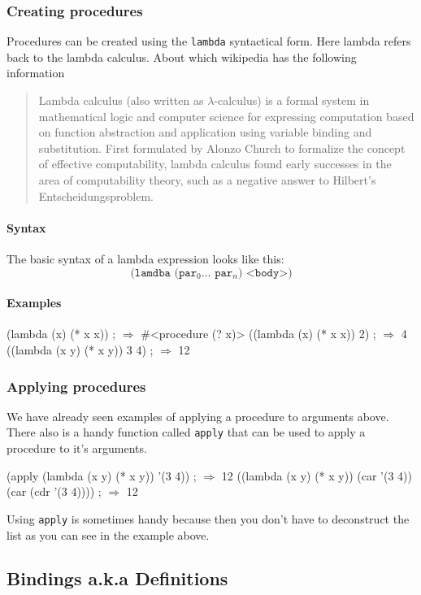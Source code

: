 \documentclass[12pt,a4paper,draft,twoside]{article}
\begin{document}
\subsubsection{Creating procedures}
Procedures can be created using the \texttt{lambda} syntactical form. Here lambda refers back to the lambda calculus. About which wikipedia \cite{lambda} has the following information
\begin{quotation}
Lambda calculus (also written as $\lambda$-calculus) is a formal system in mathematical logic and computer science for expressing computation based on function abstraction and application using variable binding and substitution. First formulated by Alonzo Church to formalize the concept of effective computability, lambda calculus found early successes in the area of computability theory, such as a negative answer to Hilbert's Entscheidungsproblem.
\end{quotation}
\paragraph{Syntax}
The basic syntax of a lambda expression looks like this:
\begin{equation*}
\texttt{(lamdba (par$_{0} \dots$ par$_{n}$) <body>)}
\end{equation*}
\paragraph{Examples}
\begin{schemecode}
(lambda (x) (* x x)) ; $\Rightarrow$ #<procedure (? x)>
((lambda (x) (* x x)) 2) ; $\Rightarrow$ 4 
((lambda (x y) (* x y)) 3 4) ; $\Rightarrow$ 12 
\end{schemecode}
\subsubsection{Applying procedures}
We have already seen examples of applying a procedure to arguments above. There also is a handy function called \texttt{apply} that can be used to apply a procedure to it's arguments.
\begin{schemecode}
(apply (lambda (x y) (* x y)) '(3 4)) ; $\Rightarrow$ 12
((lambda (x y) (* x y)) (car '(3 4)) (car (cdr '(3 4)))) ; $\Rightarrow$ 12
\end{schemecode} 
Using \texttt{apply} is sometimes handy because then you don't have to deconstruct the list as you can see in the example above.
\subsection{Bindings a.k.a Definitions}
\end{document}
